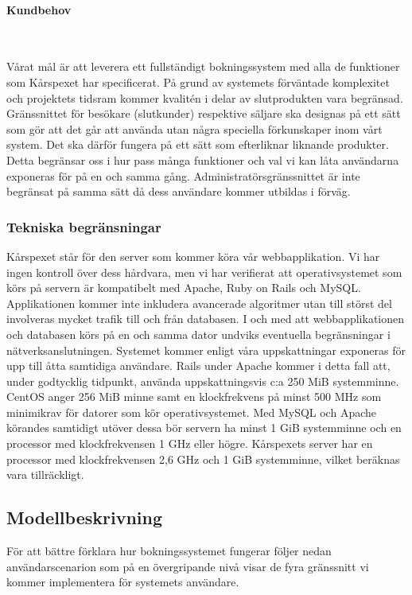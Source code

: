 \documentclass[a4paper, twoside, 11pt, titlepage]{article}
\begin{document}
			\paragraph{Kundbehov}\

			Vårat mål är att leverera ett fullständigt bokningssystem med alla de funktioner som Kårspexet har specificerat. På grund av systemets förväntade komplexitet och projektets tidsram kommer kvalitén i delar av slutprodukten vara begränsad. Gränssnittet för besökare (slutkunder) respektive säljare ska designas på ett sätt som gör att det går att använda utan några speciella förkunskaper inom vårt system. Det ska därför fungera på ett sätt som efterliknar liknande produkter. Detta begränsar oss i hur pass många funktioner och val vi kan låta användarna exponeras för på en och samma gång. Administratörsgränssnittet är inte begränsat på samma sätt då dess användare kommer utbildas i förväg.

		\subsubsection{Tekniska begränsningar}


		Kårspexet står för den server som kommer köra vår webbapplikation. Vi har ingen kontroll över dess hårdvara, men vi har verifierat att operativsystemet som körs på servern är kompatibelt med Apache, Ruby on Rails och MySQL. Applikationen kommer inte inkludera avancerade algoritmer utan till störst del involveras mycket trafik till och från databasen. I och med att webbapplikationen och databasen körs på en och samma dator undviks eventuella begränsningar i nätverksanslutningen. Systemet kommer enligt våra uppskattningar exponeras för upp till åtta samtidiga användare. Rails under Apache kommer i detta fall att, under godtycklig tidpunkt, använda uppskattningsvis c:a 250 MiB systemminne. CentOS anger 256 MiB minne samt en klockfrekvens på minst 500 MHz som minimikrav för datorer som kör operativsystemet. Med MySQL och Apache körandes samtidigt utöver dessa bör servern ha minst 1 GiB systemminne och en processor med klockfrekvensen 1 GHz eller högre. Kårspexets server har en processor med klockfrekvensen 2,6 GHz och 1 GiB systemminne, vilket beräknas vara tillräckligt.

	\subsection{Modellbeskrivning}


	För att bättre förklara hur bokningssystemet fungerar följer nedan användarscenarion som på en övergripande nivå visar de fyra gränssnitt vi kommer implementera för systemets användare.
\end{document}

